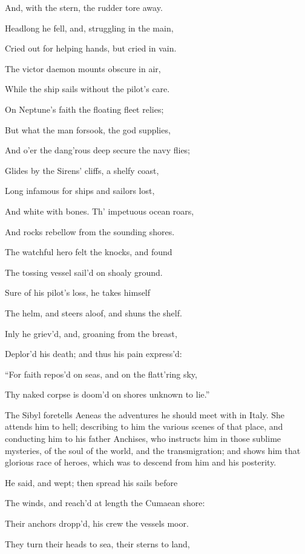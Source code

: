 And, with the stern, the rudder tore away.

Headlong he fell, and, struggling in the main,

Cried out for helping hands, but cried in vain.

The victor daemon mounts obscure in air,

While the ship sails without the pilot’s care.

On Neptune’s faith the floating fleet relies;

But what the man forsook, the god supplies,

And o’er the dang’rous deep secure the navy flies;

Glides by the Sirens’ cliffs, a shelfy coast,

Long infamous for ships and sailors lost,

And white with bones. Th’ impetuous ocean roars,

And rocks rebellow from the sounding shores.

The watchful hero felt the knocks, and found

The tossing vessel sail’d on shoaly ground.

Sure of his pilot’s loss, he takes himself

The helm, and steers aloof, and shuns the shelf.

Inly he griev’d, and, groaning from the breast,

Deplor’d his death; and thus his pain express’d:

“For faith repos’d on seas, and on the flatt’ring sky,

Thy naked corpse is doom’d on shores unknown to lie.”


The Sibyl foretells Aeneas the adventures he should meet with in Italy. She
attends him to hell; describing to him the various scenes of that place, and
conducting him to his father Anchises, who instructs him in those sublime
mysteries, of the soul of the world, and the transmigration; and shows him
that glorious race of heroes, which was to descend from him and his posterity.

He said, and wept; then spread his sails before

The winds, and reach’d at length the Cumaean shore:

Their anchors dropp’d, his crew the vessels moor.

They turn their heads to sea, their sterns to land,

